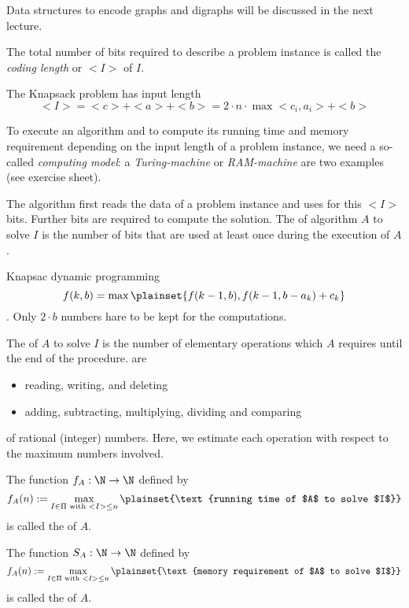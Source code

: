 Data structures to encode graphs and digraphs will be discussed in the next lecture.

The total number of bits required to describe a problem instance is called the \emph{coding length} or  $<I>$ of $I$.

\begin{xmp+}
	The Knapsack problem has input length \[
		<I> = <c> + <a> + <b> = 2 \cdot n \cdot \max<c_i, a_i> + <b>
	\]
\end{xmp+}

To execute an algorithm and to compute its running time and memory requirement depending on the input length of a problem instance, we need a so-called \emph{computing model}: a \emph{Turing-machine} or \emph{RAM-machine} are two examples (see exercise sheet).
	
The algorithm first reads the data of a problem instance and uses for this $<I>$ bits. Further bits are required to compute the solution. The  of algorithm $A$ to solve $I$ is the number of bits that are used at least once during the execution of $A$.

\begin{xmp+}
	Knapsac dynamic programming \[
		f(k,b) = \max \plainset{f(k-1,b), f(k-1, b-a_k) + c_k}
	\]. Only $2 \cdot b$ numbers hare to be kept for the computations.
\end{xmp+}

The  of $A$ to solve $I$ is the number of elementary operations which $A$ requires until the end of the procedure.  are
\begin{itemize}
	\item reading, writing, and deleting
	\item adding, subtracting, multiplying, dividing and comparing
\end{itemize}
of rational (integer) numbers. Here, we estimate each operation with respect to the maximum numbers involved.

The function $f_A:\N\rightarrow\N$ defined by
\[
	f_A(n) := \max_{I \in \Pi \text{ with } <I> \leq n} \plainset{\text{running time of $A$ to solve $I$}}
\] is called the  of $A$.

The function $S_A:\N\rightarrow\N$ defined by
\[
	f_A(n) := \max_{I \in \Pi \text{ with } <I> \leq n} \plainset{\text{memory requirement of $A$ to solve $I$}}
\] is called the  of $A$.

